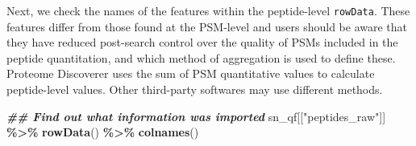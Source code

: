 \documentclass[9pt,a4paper,]{extarticle}
\newenvironment{Shaded}{\begin{snugshade}}{\end{snugshade}}
\newcommand{\DocumentationTok}[1]{\textcolor[rgb]{0.56,0.35,0.01}{\textbf{\textit{#1}}}}
\newcommand{\FunctionTok}[1]{\textcolor[rgb]{0.13,0.29,0.53}{\textbf{#1}}}
\newcommand{\NormalTok}[1]{#1}
\newcommand{\SpecialCharTok}[1]{\textcolor[rgb]{0.81,0.36,0.00}{\textbf{#1}}}
\newcommand{\StringTok}[1]{\textcolor[rgb]{0.31,0.60,0.02}{#1}}
\begin{document}
Next, we check the names of the features within the peptide-level \texttt{rowData}.
These features differ from those found at the PSM-level and users should be
aware that they have reduced post-search control over the quality of PSMs
included in the peptide quantitation, and which method of aggregation is used to
define these. Proteome Discoverer uses the sum of PSM quantitative values to
calculate peptide-level values. Other third-party softwares may use different
methods.

\begin{Shaded}
\begin{Highlighting}[]
\DocumentationTok{\#\# Find out what information was imported}
\NormalTok{sn\_qf[[}\StringTok{"peptides\_raw"}\NormalTok{]] }\SpecialCharTok{\%\textgreater{}\%}
  \FunctionTok{rowData}\NormalTok{() }\SpecialCharTok{\%\textgreater{}\%}
  \FunctionTok{colnames}\NormalTok{()}
\end{Highlighting}
\end{Shaded}
\end{document}
